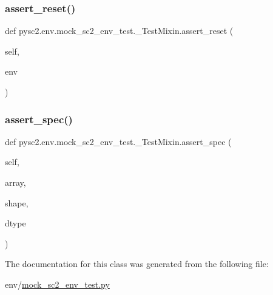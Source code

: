 \subsubsection{\texorpdfstring{assert\+\_\+reset()}{assert\_reset()}}
{\footnotesize\ttfamily def pysc2.\+env.\+mock\+\_\+sc2\+\_\+env\+\_\+test.\+\_\+\+Test\+Mixin.\+assert\+\_\+reset (\begin{DoxyParamCaption}\item[{}]{self,  }\item[{}]{env }\end{DoxyParamCaption})}

\mbox{\label{classpysc2_1_1env_1_1mock__sc2__env__test_1_1___test_mixin_ae44862283422b3f9f4cff0364e7718fe}} 
\subsubsection{\texorpdfstring{assert\+\_\+spec()}{assert\_spec()}}
{\footnotesize\ttfamily def pysc2.\+env.\+mock\+\_\+sc2\+\_\+env\+\_\+test.\+\_\+\+Test\+Mixin.\+assert\+\_\+spec (\begin{DoxyParamCaption}\item[{}]{self,  }\item[{}]{array,  }\item[{}]{shape,  }\item[{}]{dtype }\end{DoxyParamCaption})}



The documentation for this class was generated from the following file\+:\begin{DoxyCompactItemize}
\item 
env/\mbox{\hyperlink{mock__sc2__env__test_8py}{mock\+\_\+sc2\+\_\+env\+\_\+test.\+py}}\end{DoxyCompactItemize}
